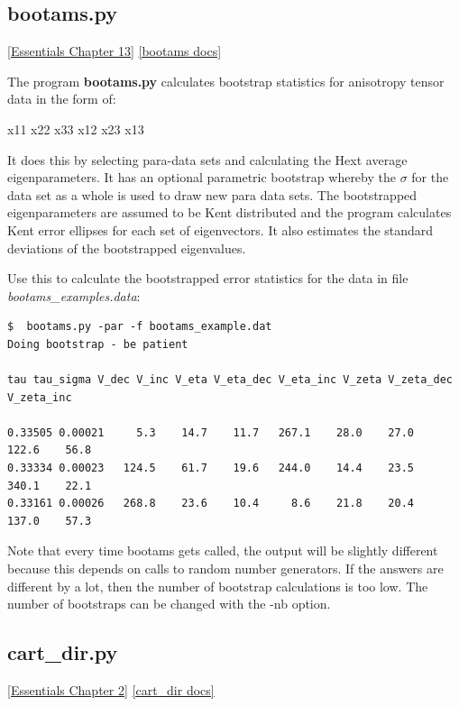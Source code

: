 \documentclass[11pt]{book}
\begin{document}
{{\subsection{bootams.py}
\href{http://earthref.org/MAGIC/books/Tauxe/Essentials/WebBook3ch13.html#ch13}{[Essentials Chapter 13]}
\href{https://github.com/PmagPy/PmagPy/blob/master/programs/bootams.py}{[bootams docs]}

The program {\bf bootams.py} calculates bootstrap statistics for anisotropy tensor data in the form of:

x11 x22 x33 x12 x23 x13

It does this by selecting para-data sets and calculating the Hext average eigenparameters.
It has an optional parametric bootstrap whereby the $\sigma$ for the data set as a whole is used to draw new para data sets.    The bootstrapped eigenparameters are assumed to be Kent distributed and the program calculates Kent error ellipses for each set of eigenvectors.  It also estimates  the standard deviations of the bootstrapped eigenvalues.

Use this to calculate the bootstrapped error statistics for the data in file {\it  bootams\_examples.data}:

\begin{verbatim}
$  bootams.py -par -f bootams_example.dat
Doing bootstrap - be patient

tau tau_sigma V_dec V_inc V_eta V_eta_dec V_eta_inc V_zeta V_zeta_dec V_zeta_inc

0.33505 0.00021     5.3    14.7    11.7   267.1    28.0    27.0   122.6    56.8
0.33334 0.00023   124.5    61.7    19.6   244.0    14.4    23.5   340.1    22.1
0.33161 0.00026   268.8    23.6    10.4     8.6    21.8    20.4   137.0    57.3

\end{verbatim}

Note that every time bootams gets called, the output will be slightly different because this depends on calls to random number generators.  If the answers are different by a lot, then the number of bootstrap calculations is too low.  The number of bootstraps can be changed with the -nb option.



\subsection {cart\_dir.py}
\href{http://earthref.org/MAGIC/books/Tauxe/Essentials/WebBook3ch2.html#ch2}{[Essentials Chapter 2]}
\href{https://github.com/PmagPy/PmagPy/blob/master/programs/cart_dir.py}{[cart\_dir docs]}

}}
\end{document}
